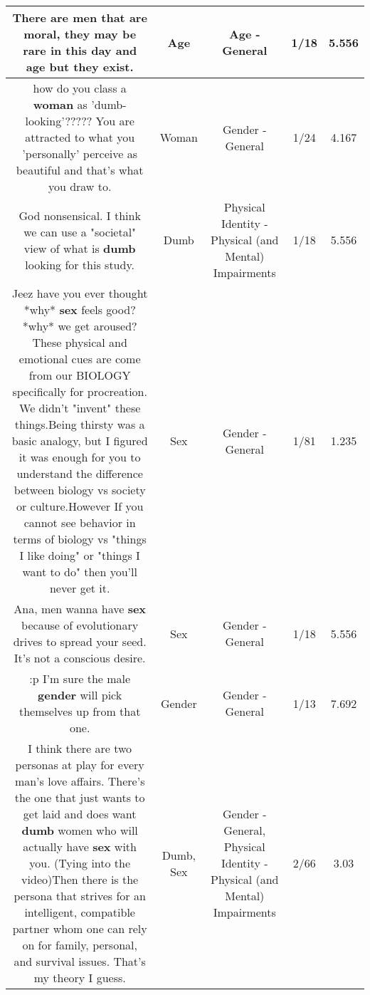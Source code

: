 \documentclass[11pt]{article}
\newlength\mylength
\begin{document}
\begin{center}
\begin{longtable}{|C{.65\mylength}|C{.30\mylength}|C{.12\mylength}|C{.12\mylength}|C{.12\mylength}|}
  \small There are men that are moral, they may be rare in this day and \textbf{age} but they exist.\normalsize   & Age & Age - General & 1/18 & 5.556 \\  \hline
  \small how do you class a \textbf{woman} as 'dumb-looking'????? You are attracted to what you 'personally' perceive as beautiful and that's what you draw to.\normalsize   & Woman & Gender - General & 1/24 & 4.167 \\  \hline
  \small God nonsensical. I think we can use a "societal" view of what is \textbf{dumb} looking for this study.\normalsize   & Dumb & Physical Identity - Physical (and Mental) Impairments & 1/18 & 5.556 \\  \hline
  \small Jeez have you ever thought *why* \textbf{sex} feels good?  *why* we get aroused? These  physical and emotional cues are come from our BIOLOGY specifically for procreation.  We didn't "invent" these things.Being thirsty was a basic analogy, but I figured it was enough for you to understand the difference between biology vs society or culture.However If you cannot see behavior in terms of biology vs "things I like doing" or "things I want to do" then you'll never get it.\normalsize   & Sex & Gender - General & 1/81 & 1.235 \\  \hline
  \small Ana, men wanna have \textbf{sex} because of evolutionary drives to spread your seed. It's not a conscious desire.\normalsize   & Sex & Gender - General & 1/18 & 5.556 \\  \hline
  \small :p I'm sure the male \textbf{gender} will pick themselves up from that one.\normalsize   & Gender & Gender - General & 1/13 & 7.692 \\  \hline
  \small I think there are two personas at play for every man's love affairs. There's the one that just wants to get laid and does want \textbf{dumb} women who will actually have \textbf{sex} with you. (Tying into the video)Then there is the persona that strives for an intelligent, compatible partner whom one can rely on for family, personal, and survival issues. That's my theory I guess.\normalsize   & Dumb, Sex & Gender - General, Physical Identity - Physical (and Mental) Impairments & 2/66 & 3.03 \\  \hline

\end{longtable}
\end{center}
\end{document}
